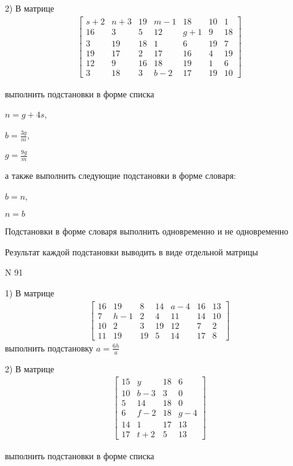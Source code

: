 \documentclass[11pt]{report}
\begin{document}
    2) В матрице
\begin{align*}
\left[\begin{matrix}s + 2 & n + 3 & 19 & m - 1 & 18 & 10 & 1\\16 & 3 & 5 & 12 & g + 1 & 9 & 18\\3 & 19 & 18 & 1 & 6 & 19 & 7\\19 & 17 & 2 & 17 & 16 & 4 & 19\\12 & 9 & 16 & 18 & 19 & 1 & 6\\3 & 18 & 3 & b - 2 & 17 & 19 & 10\end{matrix}\right]
\end{align*}

выполнить подстановки в форме списка

$n=g + 4 s$,

$b=\frac{3 g}{m}$,

$g=\frac{9 g}{m}$

а также выполнить следующие подстановки в форме словаря:

$b=n$,

$n=b$


    Подстановки в форме словаря выполнить одновременно и не одновременно


    Результат каждой подстановки выводить в виде отдельной матрицы

\newpage
N 91


    1) В матрице
\begin{align*}
\left[\begin{matrix}16 & 19 & 8 & 14 & a - 4 & 16 & 13\\7 & h - 1 & 2 & 4 & 11 & 14 & 10\\10 & 2 & 3 & 19 & 12 & 7 & 2\\11 & 19 & 19 & 5 & 14 & 17 & 8\end{matrix}\right]
\end{align*}
выполнить подстановку $a=\frac{6 h}{a}$


    2) В матрице
\begin{align*}
\left[\begin{matrix}15 & y & 18 & 6\\10 & b - 3 & 3 & 0\\5 & 14 & 18 & 0\\6 & f - 2 & 18 & g - 4\\14 & 1 & 17 & 13\\17 & t + 2 & 5 & 13\end{matrix}\right]
\end{align*}

выполнить подстановки в форме списка
\end{document}
